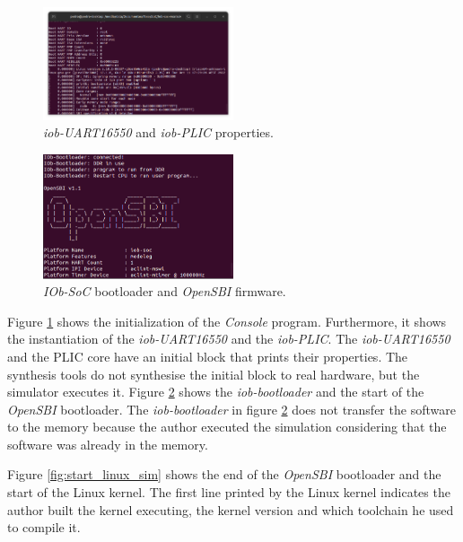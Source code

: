 \begin{figure}[!ht]
    \centering
    \includegraphics[width=0.5\textwidth]{../images/start_Linux_sim.png}
    \caption{\textit{iob-UART16550} and \textit{iob-PLIC} properties.}
    \label{fig:start_bootloader_sim}
\end{figure}
\begin{figure}[!ht]
    \centering
    \includegraphics[width=0.5\textwidth]{../images/end_bootloader_sim.png}
    \caption{\textit{IOb-SoC} bootloader and \textit{OpenSBI} firmware.}
    \label{fig:end_bootloader_sim}
\end{figure}

Figure \ref{fig:start_bootloader_sim} shows the initialization of the \textit{Console} program. Furthermore, it shows the instantiation of the \textit{iob-UART16550} and the \textit{iob-PLIC}. The \textit{iob-UART16550} and the PLIC core have an initial block that prints their properties. The synthesis tools do not synthesise the initial block to real hardware, but the simulator executes it. Figure \ref{fig:end_bootloader_sim} shows the \textit{iob-bootloader} and the start of the \textit{OpenSBI} bootloader. The \textit{iob-bootloader} in figure \ref{fig:end_bootloader_sim} does not transfer the software to the memory because the author executed the simulation considering that the software was already in the memory.

Figure \ref{fig:start_linux_sim} shows the end of the \textit{OpenSBI} bootloader and the start of the Linux kernel. The first line printed by the Linux kernel indicates the author built the kernel executing, the kernel version and which toolchain he used to compile it.

